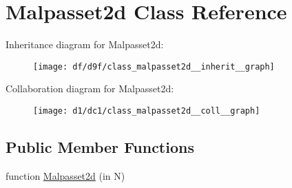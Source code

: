 \hypertarget{class_malpasset2d}{}\section{Malpasset2d Class Reference}
\label{class_malpasset2d}


Inheritance diagram for Malpasset2d\+:
\nopagebreak
\begin{figure}[H]
\begin{center}
\leavevmode
\texttt{[image: df/d9f/class\_malpasset2d\_\_inherit\_\_graph]}
\end{center}
\end{figure}


Collaboration diagram for Malpasset2d\+:
\nopagebreak
\begin{figure}[H]
\begin{center}
\leavevmode
\texttt{[image: d1/dc1/class\_malpasset2d\_\_coll\_\_graph]}
\end{center}
\end{figure}
\subsection*{Public Member Functions}
\begin{DoxyCompactItemize}
\item 
function \hyperlink{class_malpasset2d_adfbe66823d95f48a56fa174be24ad9ef}{Malpasset2d} (in N)
\end{DoxyCompactItemize}
